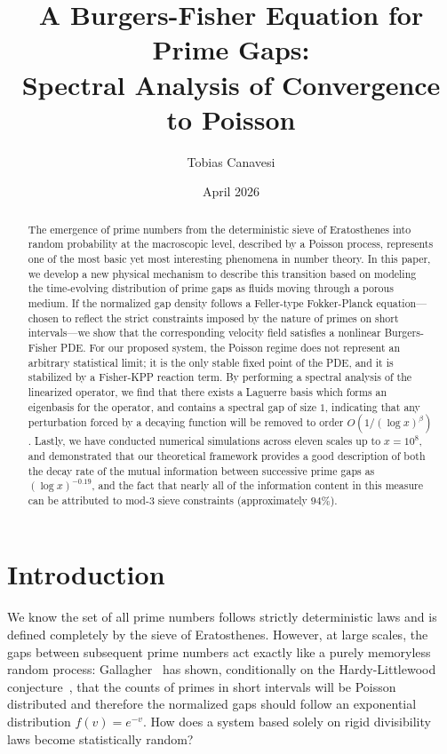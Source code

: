 \documentclass[11pt, a4paper]{amsart}
\title[A Burgers-Fisher Equation for Prime Gaps]{%
A Burgers-Fisher Equation for Prime Gaps:\\
Spectral Analysis of Convergence to Poisson}
\author{Tobias Canavesi}
\date{April 2026}
\theoremstyle{plain}
\theoremstyle{definition}
\begin{document}
\begin{abstract}
The emergence of prime numbers from the deterministic sieve of Eratosthenes 
into random probability at the macroscopic level, described by a Poisson process, 
represents one of the most basic yet most interesting phenomena in number theory. 
In this paper, we develop a new physical mechanism to describe this transition based on modeling the time-evolving 
distribution of prime gaps as fluids moving through a porous medium. If the normalized 
gap density follows a Feller-type Fokker-Planck equation---chosen to reflect the strict 
constraints imposed by the nature of primes on short intervals---we show that the 
corresponding velocity field satisfies a nonlinear Burgers-Fisher PDE. For our proposed 
system, the Poisson regime does not represent an arbitrary statistical limit; 
it is the only stable fixed point of the PDE, and it is stabilized by a Fisher-KPP 
reaction term. By performing a spectral analysis of the linearized operator, we find 
that there exists a Laguerre basis which forms an eigenbasis for the operator, 
and contains a spectral gap of size $1$, indicating that any perturbation forced 
by a decaying function will be removed to order $O(1 / (\log x)^\beta)$. Lastly, we have 
conducted numerical simulations across eleven scales up to $x=10^{8}$, and demonstrated 
that our theoretical framework provides a good description of both the decay rate of 
the mutual information between successive prime gaps as $(\log x)^{-0.19}$, and the fact 
that nearly all of the information content in this measure can be attributed to mod-$3$ 
sieve constraints (approximately $94\%$).
\end{abstract}

\maketitle
\tableofcontents

\section{Introduction}

We know the set of all prime numbers follows strictly deterministic laws and is defined completely by the sieve of Eratosthenes. 
However, at large scales, the gaps between subsequent prime numbers act exactly like a purely memoryless random process: Gallagher~\cite{Gallagher1976} 
has shown, conditionally on the Hardy-Littlewood conjecture~\cite{HL1923}, that the counts of primes in short intervals will be Poisson distributed 
and therefore the normalized gaps should follow an exponential distribution $f(v)=e^{-v}$. How does a system based solely on rigid divisibility laws 
become statistically random?
\end{document}
